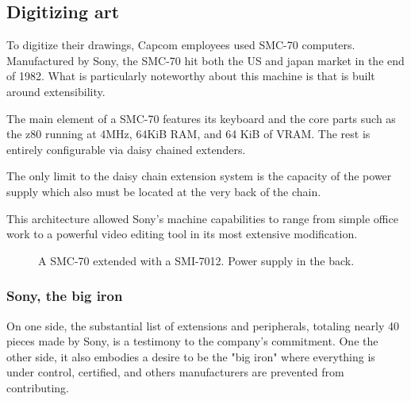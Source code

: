 

\subsection{Digitizing art}

To digitize their drawings, Capcom employees used SMC-70 computers. Manufactured by Sony, the SMC-70 hit both the US and japan market in the end of 1982. What is particularly noteworthy about this machine is that is built around extensibility. 

The main element of a SMC-70 features its keyboard and the core parts such as the z80 running at 4MHz, 64KiB RAM, and 64 KiB of VRAM. The rest is entirely configurable via daisy chained extenders. 

The only limit to the daisy chain extension system is the capacity of the power supply which also must be located at the very back of the chain. 


This architecture allowed Sony's machine capabilities to range from simple office work to a powerful video editing tool in its most extensive modification. 

\begin{figure}[H]
\caption*{A SMC-70 extended with a SMI-7012. Power supply in the back.}
\end{figure}

\subsubsection{Sony, the big iron}
On one side, the substantial list of extensions and peripherals, totaling nearly 40 pieces made by Sony, is a testimony to the company's commitment. One the other side, it also embodies a desire to be the "big iron" where everything is under control, certified, and others manufacturers are prevented from contributing.

